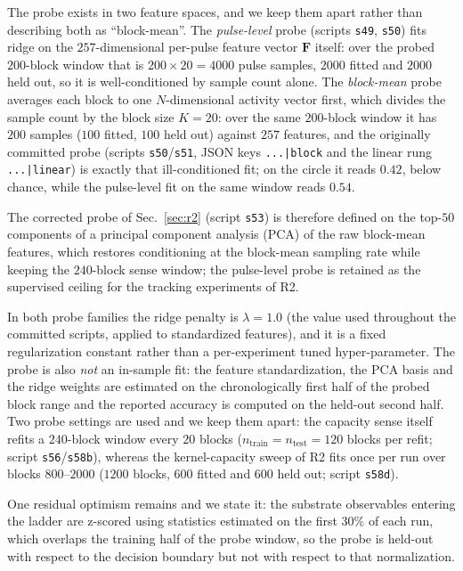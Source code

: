 \documentclass[preprint,12pt]{elsarticle}
\begin{document}
The probe exists in two feature spaces, and we keep
them apart rather than describing both as ``block-mean''. The
\emph{pulse-level} probe (scripts \texttt{s49}, \texttt{s50}) fits ridge on
the $257$-dimensional per-pulse feature vector $\mathbf F$ itself: over the
probed $200$-block window that is $200\times20=4000$ pulse samples, $2000$
fitted and $2000$ held out, so it is well-conditioned by sample count alone.
The \emph{block-mean} probe averages each block to one $N$-dimensional
activity vector first, which divides the sample count by the block size
$K=20$: over the same $200$-block window it has $200$ samples ($100$ fitted,
$100$ held out) against $257$ features, and the originally committed probe
(scripts \texttt{s50}/\texttt{s51}, JSON keys \texttt{...|block} and the
linear rung \texttt{...|linear}) is
exactly that ill-conditioned fit; on the circle it reads $0.42$, below
chance, while the pulse-level fit on the same window reads $0.54$.

The
corrected probe of Sec.~\ref{sec:r2} (script \texttt{s53}) is therefore
defined on the top-$50$ components of a principal component analysis (PCA) of
the raw block-mean features, which
restores conditioning at the block-mean sampling rate while keeping the
$240$-block sense window; the pulse-level probe is retained as the supervised
ceiling for the tracking experiments of R2.

In both probe families the ridge
penalty is
$\lambda=1.0$ (the value used throughout the committed scripts, applied to
standardized features), and it is a fixed regularization constant rather
than a per-experiment tuned hyper-parameter. The probe is also \emph{not}
an in-sample fit: the feature standardization, the PCA basis and the ridge
weights are estimated on the chronologically first half of the probed block
range and the reported accuracy is computed on the held-out second half. Two
probe settings are used and we keep them apart: the capacity sense itself
refits a $240$-block window every $20$ blocks ($n_{\mathrm{train}}=
n_{\mathrm{test}}=120$ blocks per refit; script \texttt{s56}/\texttt{s58b}),
whereas the kernel-capacity sweep of R2 fits once per run over blocks
$800$--$2000$ ($1200$ blocks, $600$ fitted and $600$ held out; script
\texttt{s58d}).

One residual optimism remains and we state it: the
substrate observables entering the ladder are z-scored using statistics
estimated on the first $30\%$ of each run, which overlaps the training half
of the probe window, so the probe is held-out with respect to the decision
boundary but not with respect to that normalization.
\end{document}
